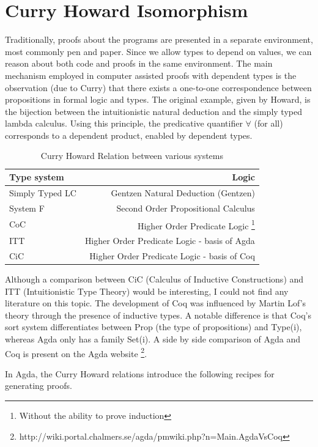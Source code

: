 \documentclass[12pt,twoside,notitlepage]{report}
\begin{document}
\section{Curry Howard Isomorphism}

Traditionally, proofs about the programs are presented in a separate environment, most commonly pen and paper. Since we allow types to depend on values, we can reason about both code and proofs in the same environment. 
The main mechanism employed in computer assisted proofs with dependent types is the observation (due to Curry) that there exists a one-to-one correspondence between propositions in formal logic and types. The original example, given by Howard, is the bijection between the intuitionistic natural deduction and the simply typed lambda calculus.
Using this principle, the predicative quantifier $\forall$ (for all) corresponds to a dependent product, enabled by dependent types.


\begin{table}[h!]
\centering 
	\begin{tabular}{l r} 
	\hline
	Type system & Logic \\
	\hline 
	Simply Typed LC  & Gentzen Natural Deduction (Gentzen) \\
	System F & Second Order Propositional Calculus \\
	CoC &  Higher Order Predicate Logic \footnote{Without the ability to prove induction} \\
	ITT & Higher Order Predicate Logic - basis of Agda \\ 
	CiC & Higher Order Predicate Logic - basis of Coq \\   
	\hline 
	\end{tabular}
\caption{Curry Howard Relation between various systems}
\end{table}

Although a comparison between CiC (Calculus of Inductive Constructions) and ITT (Intuitionistic Type Theory) would be interesting, I could not find any literature on this topic. The development of Coq was influenced by Martin Lof’s theory through the presence of inductive types\cite{certified}. A notable difference is that Coq’s sort system differentiates between Prop (the type of propositions) and Type(i), whereas Agda only has a family Set(i). A side by side comparison of Agda and Coq is present on the Agda website \footnote{http://wiki.portal.chalmers.se/agda/pmwiki.php?n=Main.AgdaVsCoq}.

In Agda, the Curry Howard relations introduce the following recipes for generating proofs.
\end{document}
